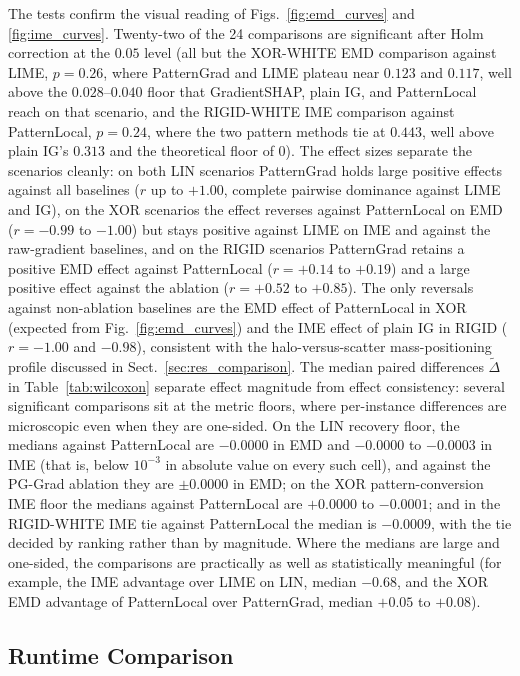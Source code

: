 \documentclass[pdflatex,sn-mathphys-num]{sn-jnl}
\theoremstyle{thmstyleone}
\theoremstyle{thmstyletwo}%
\theoremstyle{thmstylethree}%
\begin{document}
The tests confirm the visual reading of Figs.~\ref{fig:emd_curves} and \ref{fig:ime_curves}. Twenty-two of the 24 comparisons are significant after Holm correction at the $0.05$ level (all but the XOR-WHITE EMD comparison against LIME, $p = 0.26$, where PatternGrad and LIME plateau near $0.123$ and $0.117$, well above the $0.028$--$0.040$ floor that GradientSHAP, plain IG, and PatternLocal reach on that scenario, and the RIGID-WHITE IME comparison against PatternLocal, $p = 0.24$, where the two pattern methods tie at $0.443$, well above plain IG's $0.313$ and the theoretical floor of $0$). The effect sizes separate the scenarios cleanly: on both LIN scenarios PatternGrad holds large positive effects against all baselines ($r$ up to $+1.00$, complete pairwise dominance against LIME and IG), on the XOR scenarios the effect reverses against PatternLocal on EMD ($r = -0.99$ to $-1.00$) but stays positive against LIME on IME and against the raw-gradient baselines, and on the RIGID scenarios PatternGrad retains a positive EMD effect against PatternLocal ($r = +0.14$ to $+0.19$) and a large positive effect against the ablation ($r = +0.52$ to $+0.85$). The only reversals against non-ablation baselines are the EMD effect of PatternLocal in XOR (expected from Fig.~\ref{fig:emd_curves}) and the IME effect of plain IG in RIGID ($r = -1.00$ and $-0.98$), consistent with the halo-versus-scatter mass-positioning profile discussed in Sect.~\ref{sec:res_comparison}. The median paired differences $\widetilde{\Delta}$ in Table~\ref{tab:wilcoxon} separate effect magnitude from effect consistency: several significant comparisons sit at the metric floors, where per-instance differences are microscopic even when they are one-sided. On the LIN recovery floor, the medians against PatternLocal are $-0.0000$ in EMD and $-0.0000$ to $-0.0003$ in IME (that is, below $10^{-3}$ in absolute value on every such cell), and against the PG-Grad ablation they are $\pm 0.0000$ in EMD; on the XOR pattern-conversion IME floor the medians against PatternLocal are $+0.0000$ to $-0.0001$; and in the RIGID-WHITE IME tie against PatternLocal the median is $-0.0009$, with the tie decided by ranking rather than by magnitude. Where the medians are large and one-sided, the comparisons are practically as well as statistically meaningful (for example, the IME advantage over LIME on LIN, median $-0.68$, and the XOR EMD advantage of PatternLocal over PatternGrad, median $+0.05$ to $+0.08$).

\subsection{Runtime Comparison}\label{sec:res_runtime}
\end{document}

